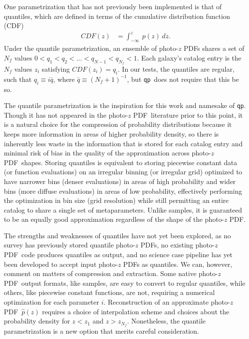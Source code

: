 \documentclass[\docopts]{\docclass}
\newcommand{\qp}{\texttt{qp}}
\newcommand{\pz}{photo-$z$ PDF}
\begin{document}
One parametrization that has not previously been implemented is that of 
quantiles, which are defined in terms of the cumulative distribution function 
(CDF)
\begin{align}
  \label{eq:cdf}
  CDF(z) &= \int_{-\infty}^{z}\ p(z)\ dz.
\end{align}
Under the quantile parametrization, an ensemble of \pz s shares a set of 
$N_{f}$ values $0<q_{1}<q_{2}<\dots<q_{N-1}<q_{N_{f}}<1$.  Each galaxy's 
catalog entry is the $N_{f}$ values $z_{i}$ satisfying $CDF(z_{i})=q_{i}$.  In 
our tests, the quantiles are regular, such that $q_{i}\equiv i\bar{q}$, where 
$\bar{q}\equiv(N_{f}+1)^{-1}$, but \qp\ does not require that this be so.

The quantile parametrization is the inspiration for this work and namesake of 
\qp.  Though it has not appeared in the \pz\ literature prior to this point, it 
is a natural choice for the compression of probability distributions because it 
keeps more information in areas of higher probability density, so there is 
inherently less waste in the information that is stored for each catalog entry 
and minimal risk of bias in the quality of the approximation across \pz\ 
shapes.  Storing quantiles is equivalent to storing piecewise constant data (or 
function evaluations) on an irregular binning (or irregular grid) optimized to 
have narrower bins (denser evaluations) in areas of high probability and wider 
bins (more diffuse evaluations) in areas of low probability, effectively 
performing the optimization in bin size (grid resolution) while still 
permitting an entire catalog to share a single set of metaparameters.  Unlike 
samples, it is guaranteed to be an equally good approximation regardless of the 
shape of the \pz.

The strengths and weaknesses of quantiles have not yet been explored, as no 
survey has previously stored quantile \pz s, no existing \pz\ code produces 
quantiles as output, and no science case pipeline has yet been developed to 
accept input \pz s as quantiles.  We can, however, comment on matters of 
compression and extraction.  Some native \pz\ output formats, like samples, are 
easy to convert to regular quantiles, while others, like piecewise constant 
functions, are not, requiring a numerical optimization for each parameter $i$.  
Reconstruction of an approximate \pz\ $\hat{p}(z)$ requires a choice of 
interpolation scheme and choices about the probability density for $z<z_{1}$ 
and $z>z_{N_{f}}$.  Nonetheless, the quantile parametrization is a new option 
that merits careful consideration.
\end{document}
